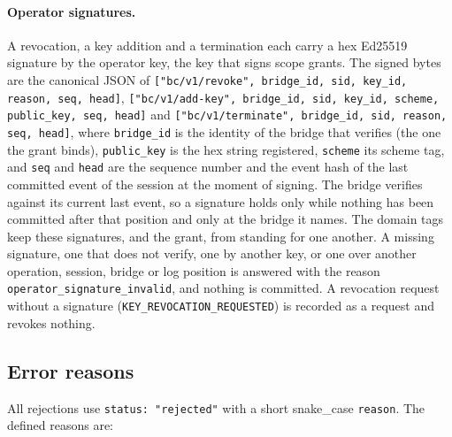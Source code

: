 \paragraph{Operator signatures.}
A revocation, a key addition and a termination each carry a hex Ed25519
signature by the operator key, the key that signs scope grants. The signed
bytes are the canonical JSON of
\texttt{["bc/v1/revoke", bridge\_id, sid, key\_id, reason, seq, head]},
\texttt{["bc/v1/add-key", bridge\_id, sid, key\_id, scheme, public\_key,
seq, head]} and
\texttt{["bc/v1/terminate", bridge\_id, sid, reason, seq, head]}, where
\texttt{bridge\_id} is the identity of the bridge that verifies (the one
the grant binds), \texttt{public\_key} is the hex string registered,
\texttt{scheme} its scheme tag, and \texttt{seq} and \texttt{head} are the
sequence number and the event hash of the last committed event of the
session at the moment of signing. The bridge verifies against its current
last event, so a signature holds only while nothing has been committed
after that position and only at the bridge it names. The domain
tags keep these signatures, and the grant, from standing for one another.
A missing signature, one that does not verify, one by another key, or one
over another operation, session, bridge or log position is answered with
the reason \texttt{operator\_signature\_invalid}, and nothing is committed. A
revocation request without a signature (\texttt{KEY\_REVOCATION\_REQUESTED})
is recorded as a request and revokes nothing.

\subsection{Error reasons}

All rejections use \texttt{status: "rejected"} with a short
snake\_case \texttt{reason}. The defined reasons are:

